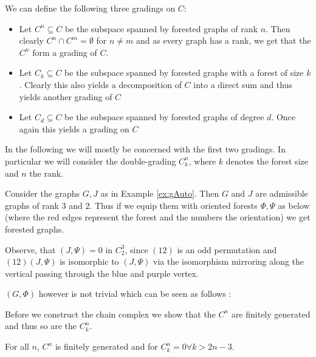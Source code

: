 We can define the following three gradings on $C$:
 \begin{itemize}
	\item Let $C^{n} \subseteq C$ be the subspace spanned by forested graphs of rank $n$. Then clearly  $C^{n} \cap C^{m} = \emptyset$ for $n \neq m$ and
		as every graph has a rank, we get that the $C^{n}$ form a grading of $C$.
	\item Let $C_{k} \subseteq C$ be the subspace spanned by forested graphs with a forest of size $k$. Clearly this also yields a decomposition of $C$ into a direct sum
		and thus yields another grading of $C$
	\item Let  $C_{d} \subseteq C$ be the subspace spanned by forested graphs of degree $d$. Once again this yields a grading on $C$
\end{itemize}
In the following we will mostly be concerned with the first two gradings. In particular we will consider the double-grading $C_{k}^{n}$,
where $k$ denotes the forest size and $n$ the rank. 

\begin{eg}
	Consider the graphs $G, J$ as in Example \ref{ex:gAuto}. Then $G$ and $J$ are admissible graphs of rank $3$ and $2$. Thus if we equip them with oriented forests $\Phi, \Psi$ as below 
	(where the red edges represent the forest and the numbers the orientation) we get forested graphs.


	Observe, that $(J,\Psi) = 0$ in $C_{2}^{3}$, since $ (1 2)$ is an odd permutation and  $(1 2) (J,\Psi)$ is isomorphic to $(J,\Psi)$ 
	via the isomorphism mirroring along the vertical passing through the blue and purple vertex.

	$(G,\Phi)$ however is not trivial which can be seen as follows : 
\end{eg}

Before we construct the chain complex we show that the $C^{n}$ are finitely generated and thus so are the $C_{k}^{n}$.

\begin{theorem}
	For all $n$, $C^{n}$ is finitely generated and for $C_{k}^{n} = 0 \forall k > 2n-3$. 
\end{theorem}

